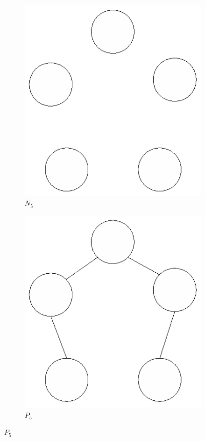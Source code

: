 \begin{figure}
  \centering
\begin{subfigure}{.26\textwidth}
  \centering
  \includegraphics[width=.8\linewidth]{figs/N5.eps}
  \caption{$N_5$}
  \label{fig:notable-N5}
\end{subfigure}
\begin{subfigure}{.26\textwidth}
  \centering
  \includegraphics[width=.8\linewidth]{figs/P5.eps}
  \caption{$P_5$}
  \label{fig:notable-P5}

\end{subfigure}
\end{figure}
